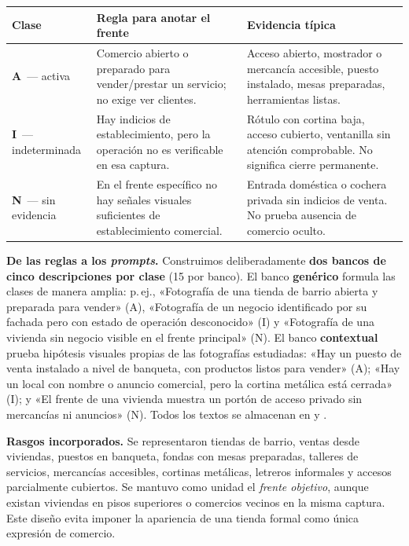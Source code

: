 \documentclass[10pt,a4paper]{article}
\newcommand{\tagA}{\textbf{A}}
\newcommand{\tagI}{\textbf{I}}
\newcommand{\tagN}{\textbf{N}}
\begin{document}
\begin{center}
\small
\begin{tabularx}{\linewidth}{@{}p{1.25cm}Y Y@{}}
\toprule
\textbf{Clase} & \textbf{Regla para anotar el frente} & \textbf{Evidencia típica}\\
\midrule
\tagA\ — activa & Comercio abierto o preparado para vender/prestar un servicio; no exige ver clientes. & Acceso abierto, mostrador o mercancía accesible, puesto instalado, mesas preparadas, herramientas listas.\\
\tagI\ — indeterminada & Hay indicios de establecimiento, pero la operación no es verificable en esa captura. & Rótulo con cortina baja, acceso cubierto, ventanilla sin atención comprobable. No significa cierre permanente.\\
\tagN\ — sin evidencia & En el frente específico no hay señales visuales suficientes de establecimiento comercial. & Entrada doméstica o cochera privada sin indicios de venta. No prueba ausencia de comercio oculto.\\
\bottomrule
\end{tabularx}
\end{center}

\textbf{De las reglas a los \emph{prompts}.} Construimos deliberadamente \textbf{dos bancos de cinco descripciones por clase} (15 por banco). El banco \textbf{genérico} formula las clases de manera amplia: p.\,ej., «Fotografía de una tienda de barrio abierta y preparada para vender» (A), «Fotografía de un negocio identificado por su fachada pero con estado de operación desconocido» (I) y «Fotografía de una vivienda sin negocio visible en el frente principal» (N). El banco \textbf{contextual} prueba hipótesis visuales propias de las fotografías estudiadas: «Hay un puesto de venta instalado a nivel de banqueta, con productos listos para vender» (A); «Hay un local con nombre o anuncio comercial, pero la cortina metálica está cerrada» (I); y «El frente de una vivienda muestra un portón de acceso privado sin mercancías ni anuncios» (N). Todos los textos se almacenan en  y .

\textbf{Rasgos incorporados.} Se representaron tiendas de barrio, ventas desde viviendas, puestos en banqueta, fondas con mesas preparadas, talleres de servicios, mercancías accesibles, cortinas metálicas, letreros informales y accesos parcialmente cubiertos. Se mantuvo como unidad el \emph{frente objetivo}, aunque existan viviendas en pisos superiores o comercios vecinos en la misma captura. Este diseño evita imponer la apariencia de una tienda formal como única expresión de comercio.
\end{document}
